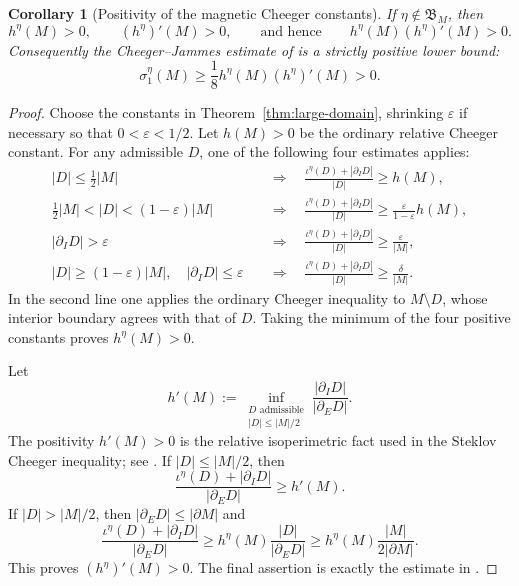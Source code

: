 \documentclass[11pt]{amsart}
\newtheorem{corollary}[theorem]{Corollary}
\newcommand{\Bspace}{\mathfrak B}
\newcommand{\frust}{\iota}
\begin{document}
\begin{corollary}[Positivity of the magnetic Cheeger constants]
\label{cor:cheeger}
If $\eta\notin\Bspace_M$, then
\[
 h^\eta(M)>0,
 \qquad
 (h^\eta)'(M)>0,
 \qquad\text{and hence}\qquad
 h^\eta(M)(h^\eta)'(M)>0.
\]
Consequently the Cheeger--Jammes estimate of \cite[Theorem~2.5]{CGHP} is a
strictly positive lower bound:
\[
 \sigma_1^\eta(M)
 \geq \frac18 h^\eta(M)(h^\eta)'(M)>0.
\]
\end{corollary}

\begin{proof}
Choose the constants in Theorem~\ref{thm:large-domain}, shrinking
$\varepsilon$ if necessary so that $0<\varepsilon<1/2$.  Let $h(M)>0$ be the
ordinary relative Cheeger constant.  For any admissible $D$, one of the
following four estimates applies:
\begin{align*}
 |D|\leq\tfrac12|M|
 &\quad\Longrightarrow\quad
 \frac{\frust^\eta(D)+|\partial_I D|}{|D|}\geq h(M),\\
 \tfrac12|M|<|D|<(1-\varepsilon)|M|
 &\quad\Longrightarrow\quad
 \frac{\frust^\eta(D)+|\partial_I D|}{|D|}
 \geq \frac{\varepsilon}{1-\varepsilon}h(M),\\
 |\partial_I D|>\varepsilon
 &\quad\Longrightarrow\quad
 \frac{\frust^\eta(D)+|\partial_I D|}{|D|}
 \geq\frac{\varepsilon}{|M|},\\
 |D|\geq(1-\varepsilon)|M|,
 \quad |\partial_I D|\leq\varepsilon
 &\quad\Longrightarrow\quad
 \frac{\frust^\eta(D)+|\partial_I D|}{|D|}
 \geq\frac{\delta}{|M|}.
\end{align*}
In the second line one applies the ordinary Cheeger inequality to
$M\setminus D$, whose interior boundary agrees with that of $D$.  Taking the
minimum of the four positive constants proves $h^\eta(M)>0$.

Let
\[
 h'(M):=
 \inf_{\substack{D\text{ admissible}\\ |D|\leq |M|/2}}
 \frac{|\partial_I D|}{|\partial_E D|}.
\]
The positivity $h'(M)>0$ is the relative isoperimetric fact used in the
Steklov Cheeger inequality; see \cite[Theorem~1]{Jammes}.  If
$|D|\leq|M|/2$, then
\[
 \frac{\frust^\eta(D)+|\partial_I D|}{|\partial_E D|}
 \geq h'(M).
\]
If $|D|>|M|/2$, then $|\partial_E D|\leq|\partial M|$ and
\[
 \frac{\frust^\eta(D)+|\partial_I D|}{|\partial_E D|}
 \geq h^\eta(M)\frac{|D|}{|\partial_E D|}
 \geq h^\eta(M)\frac{|M|}{2|\partial M|}.
\]
This proves $(h^\eta)'(M)>0$.  The final assertion is exactly the estimate in
\cite[Theorem~2.5]{CGHP}.
\end{proof}
\end{document}
